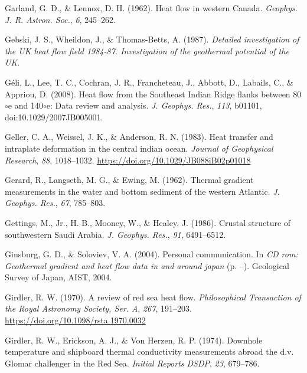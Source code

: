 \begin{CSLReferences}{1}{1}
\leavevmode{}%
Garland, G. D., \& Lennox, D. H. (1962). Heat flow in western {Canada}. \emph{Geophys. J. R. Astron. Soc.}, \emph{6}, 245--262.

\leavevmode{}%
Gebski, J. S., Wheildon, J., \& Thomas-Betts, A. (1987). \emph{Detailed investigation of the UK heat flow field 1984-87. Investigation of the geothermal potential of the UK}.

\leavevmode{}%
Géli, L., Lee, T. C., Cochran, J. R., Francheteau, J., Abbott, D., Labails, C., \& Appriou, D. (2008). Heat flow from the {Southeast Indian Ridge} flanks between 80\(\circ\)e and 140\(\circ\)e: Data review and analysis. \emph{J. Geophys. Res.}, \emph{113}, b01101, doi:10.1029/2007JB005001.

\leavevmode{}%
Geller, C. A., Weissel, J. K., \& Anderson, R. N. (1983). Heat transfer and intraplate deformation in the central indian ocean. \emph{Journal of Geophysical Research}, \emph{88}, 1018--1032. \url{https://doi.org/10.1029/JB088iB02p01018}

\leavevmode{}%
Gerard, R., Langseth, M. G., \& Ewing, M. (1962). Thermal gradient measurements in the water and bottom sediment of the western {Atlantic}. \emph{J. Geophys. Res.}, \emph{67}, 785--803.

\leavevmode{}%
Gettings, M., Jr., H. B., Mooney, W., \& Healey, J. (1986). Crustal structure of southwestern {Saudi Arabia}. \emph{J. Geophys. Res.}, \emph{91}, 6491--6512.

\leavevmode{}%
Ginsburg, G. D., \& Soloviev, V. A. (2004). Personal communication. In \emph{CD rom: Geothermal gradient and heat flow data in and around japan} (p. --). Geological Survey of Japan, AIST, 2004.

\leavevmode{}%
Girdler, R. W. (1970). A review of red sea heat flow. \emph{Philosophical Transaction of the Royal Astronomy Society, Ser. A}, \emph{267}, 191--203. \url{https://doi.org/10.1098/rsta.1970.0032}

\leavevmode{}%
Girdler, R. W., Erickson, A. J., \& Von Herzen, R. P. (1974). Downhole temperature and shipboard thermal conductivity measurements abroad the d.v. Glomar challenger in the {Red Sea}. \emph{Initial Reports DSDP}, \emph{23}, 679--786.


\end{CSLReferences}
